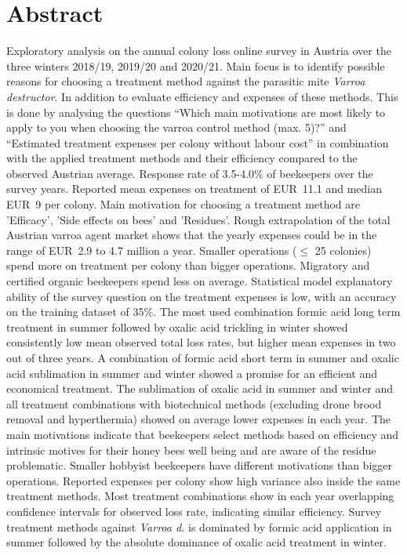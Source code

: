 \chapter*{Abstract}
\label{sec:abstract}
\vspace*{-10mm}

Exploratory analysis on the annual colony loss online survey in Austria over the three winters 2018/19, 2019/20 and 2020/21. Main focus is to identify possible reasons for choosing a treatment method against the parasitic mite \textit{Varroa destructor}. In addition to evaluate efficiency and expenses of these methods. This is done by analysing the questions \enquote{Which main motivations are most likely to apply to you when choosing the varroa control method (max. 5)?} and \enquote{Estimated treatment expenses per colony without labour cost} in combination with the applied treatment methods and their efficiency compared to the observed Austrian average. Response rate of 3.5-4.0\% of beekeepers over the survey years. Reported mean expenses on treatment of EUR~11.1 and median EUR~9 per colony. Main motivation for choosing a treatment method are 'Efficacy', 'Side effects on bees' and 'Residues'. Rough extrapolation of the total Austrian varroa agent market shows that the yearly expenses could be in the range of EUR~2.9 to 4.7 million a year. Smaller operations ($\leq$ 25 colonies) spend more on treatment per colony than bigger operations. Migratory and certified organic beekeepers spend less on average. Statistical model explanatory ability of the survey question on the treatment expenses is low, with an accuracy on the training dataset of 35\%. The most used combination formic acid long term treatment in summer followed by oxalic acid trickling in winter showed consistently low mean observed total loss rates, but higher mean expenses in two out of three years. A combination of formic acid short term in summer and oxalic acid sublimation in summer and winter showed a promise for an efficient and economical treatment. The sublimation of oxalic acid in summer and winter and all treatment combinations with biotechnical methods (excluding drone brood removal and hyperthermia) showed on average lower expenses in each year. The main motivations indicate that beekeepers select methods based on efficiency and intrinsic motives for their honey bees well being and are aware of the residue problematic. Smaller hobbyist beekeepers have different motivations than bigger operations. Reported expenses per colony show high variance also inside the same treatment methods. Most treatment combinations show in each year overlapping confidence intervals for observed loss rate, indicating similar efficiency. Survey treatment methods against \textit{Varroa d.} is dominated by formic acid application in summer followed by the absolute dominance of oxalic acid treatment in winter.

